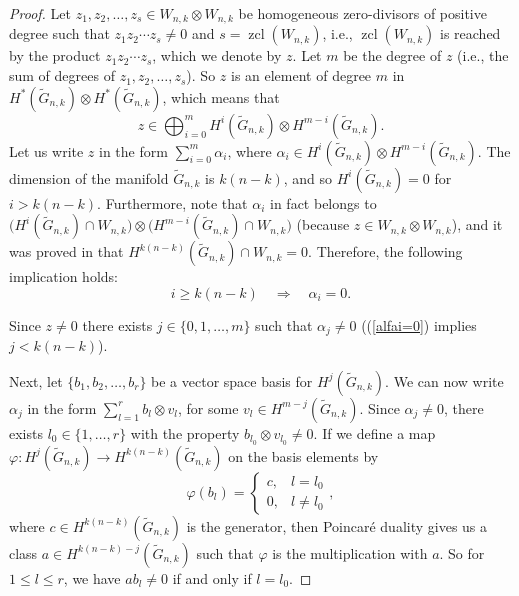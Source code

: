 \documentclass{amsart}
\theoremstyle{definition}
\theoremstyle{remark}
\numberwithin{equation}{section}
\newcommand{\gr}{\widetilde G}
\newcommand{\zcl}{\operatorname{zcl}}
\renewcommand{\le}{\leqslant}
\renewcommand{\ge}{\geqslant}
\begin{document}
\begin{proof}
 Let $z_1,z_2,\ldots,z_s\in W_{n,k}\otimes W_{n,k}$ be homogeneous zero-divisors of positive degree such that $z_1z_2\cdots z_s\ne0$ and $s=\zcl(W_{n,k})$, i.e., $\zcl(W_{n,k})$ is reached by the product $z_1z_2\cdots z_s$, which we denote by $z$. Let $m$ be the degree of $z$ (i.e., the sum of degrees of $z_1,z_2,\ldots,z_s$). So $z$ is an element of degree $m$ in $H^*(\gr_{n,k})\otimes H^*(\gr_{n,k})$, which means that
    \[z\in\bigoplus_{i = 0}^m H^i(\gr_{n,k}) \otimes H^{m-i}(\gr_{n,k}).\]
Let us write $z$ in the form $\sum_{i=0}^m\alpha_i$, where $\alpha_i\in H^i(\gr_{n,k}) \otimes H^{m-i}(\gr_{n,k})$. The dimension of the manifold $\gr_{n,k}$ is $k(n-k)$, and so $H^i(\gr_{n,k})=0$ for $i>k(n-k)$. Furthermore, note that $\alpha_i$ in fact belongs to $\big(H^i(\gr_{n,k})\cap W_{n,k}\big) \otimes \big(H^{m-i}(\gr_{n,k})\cap W_{n,k}\big)$ (because $z\in W_{n,k}\otimes W_{n,k}$), and it was proved in \cite[p.\ 1171]{Korbas} that $H^{k(n-k)}(\gr_{n,k})\cap W_{n,k}=0$. Therefore, the following implication holds:
\begin{equation}\label{alfai=0}
    i\ge k(n-k) \quad \Longrightarrow \quad \alpha_i=0.
\end{equation}

Since $z\ne0$ there exists $j\in\{0,1,\dots,m\}$ such that $\alpha_j\ne 0$ ((\ref{alfai=0}) implies $j<k(n-k)$). 

Next, let $\{b_1,b_2,\dots,b_r\}$ be a vector space basis for $H^j(\gr_{n,k})$. We can now write $\alpha_j$ in the form $\sum_{l=1}^r b_l\otimes v_l$, for some $v_l\in H^{m-j}(\gr_{n,k})$. Since $\alpha_j\ne0$, there exists $l_0\in\{1,\dots,r\}$ with the property $b_{l_0}\otimes v_{l_0}\ne0$. If we define a map $\varphi:H^j(\gr_{n,k})\rightarrow H^{k(n-k)}(\gr_{n,k})$ on the basis elements by
\[\varphi(b_l) = \begin{cases}
    c, & l = l_0\\
    0, & l \ne l_0
\end{cases},\]
where $c\in H^{k(n-k)}(\gr_{n,k})$ is the generator, then Poincar\'e duality gives us a class $a\in H^{k(n-k)-j}(\gr_{n,k})$ such that $\varphi$ is the multiplication with $a$. So for $1\le l \le r$, we have $ab_l \ne 0$ if and only if $l = l_0$. 


\end{proof}
\end{document}
